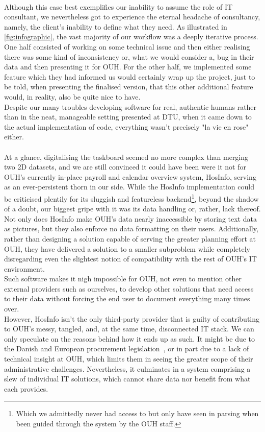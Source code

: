 \\
Although this case best exemplifies our inability to assume the role of IT consultant, we nevertheless got to experience the eternal headache of consultancy, namely, the client's inability to define what they need. As illustrated in \autoref{fig:infographic}, the vast majority of our workflow was a deeply iterative process. One half consisted of working on some technical issue and then either realising there was some kind of inconsistency or, what we would consider a, bug in their data and then presenting it for OUH. For the other half, we implemented some feature which they had informed us would certainly wrap up the project, just to be told, when presenting the finalised version, that this other additional feature would, in reality, also be quite nice to have.
\\
Despite our many troubles developing software for real, authentic humans rather than in the neat, manageable setting presented at DTU, when it came down to the actual implementation of code, everything wasn't precisely "la vie en rose" either.
\\
\\
At a glance, digitalising the taskboard seemed no more complex than merging two 2D datasets, and we are still convinced it could have been were it not for OUH's currently in-place payroll and calendar overview system, HosInfo, serving as an ever-persistent thorn in our side. While the HosInfo implementation could be criticised plentily for its sluggish and featureless backend\footnote{Which we admittedly never had access to but only have seen in parsing when been guided through the system by the OUH staff.}, beyond the shadow of a doubt, our biggest gripe with it was its data handling or, rather, lack thereof. Not only does HosInfo make OUH's data nearly inaccessible by storing text data as pictures, but they also enforce no data formatting on their users. Additionally, rather than designing a solution capable of serving the greater planning effort at OUH, they have delivered a solution to a smaller subproblem while completely disregarding even the slightest notion of compatibility with the rest of OUH's IT environment.
\\
Such software makes it nigh impossible for OUH, not even to mention other external providers such as ourselves, to develop other solutions that need access to their data without forcing the end user to document everything many times over.
\\ 
However, HosInfo isn't the only third-party provider that is guilty of contributing to OUH's messy, tangled, and, at the same time, disconnected IT stack. We can only speculate on the reasons behind how it ends up as such. It might be due to the Danish and European procurement legislation~\cite{Udbudsloven, EU-Procurement-Legislation}, or in part due to a lack of technical insight at OUH, which limits them in seeing the greater scope of their administrative challenges. Nevertheless, it culminates in a system comprising a slew of individual IT solutions, which cannot share data nor benefit from what each provides.

